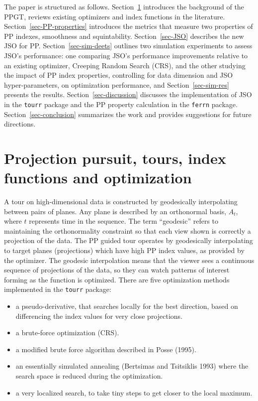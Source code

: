 \documentclass[
  12pt,
]{interact}
\providecommand{\tightlist}{%
  \setlength{\itemsep}{0pt}\setlength{\parskip}{0pt}}\usepackage{longtable,booktabs,array}
\theoremstyle{plain}
\begin{document}
The paper is structured as follows. Section~\ref{sec-background}
introduces the background of the PPGT, reviews existing optimizers and
index functions in the literature. Section~\ref{sec-PP-properties}
introduces the metrics that measure two properties of PP indexes,
smoothness and squintability. Section~\ref{sec-JSO} describes the new
JSO for PP. Section~\ref{sec-sim-deets} outlines two simulation
experiments to assess JSO's performance: one comparing JSO's performance
improvements relative to an existing optimizer, Creeping Random Search
(CRS), and the other studying the impact of PP index properties,
controlling for data dimension and JSO hyper-parameters, on optimization
performance, and Section~\ref{sec-sim-res} presents the results.
Section~\ref{sec-discussion} discusses the implementation of JSO in the
\texttt{tourr} package and the PP property calculation in the
\texttt{ferrn} package. Section~\ref{sec-conclusion} summarizes the work
and provides suggestions for future directions.

\section{Projection pursuit, tours, index functions and
optimization}\label{sec-background}

A tour on high-dimensional data is constructed by geodesically
interpolating between pairs of planes. Any plane is described by an
orthonormal basis, \(A_t\), where \(t\) represents time in the sequence.
The term ``geodesic'' refers to maintaining the orthonormality
constraint so that each view shown is correctly a projection of the
data. The PP guided tour operates by geodesically interpolating to
target planes (projections) which have high PP index values, as provided
by the optimizer. The geodesic interpolation means that the viewer sees
a continuous sequence of projections of the data, so they can watch
patterns of interest forming as the function is optimized. There are
five optimization methods implemented in the \texttt{tourr} package:

\begin{itemize}
\tightlist
\item
  a pseudo-derivative, that searches locally for the best direction,
  based on differencing the index values for very close projections.
\item
  a brute-force optimization (CRS).
\item
  a modified brute force algorithm described in Posse (1995).
\item
  an essentially simulated annealing (Bertsimas and Tsitsiklis 1993)
  where the search space is reduced during the optimization.
\item
  a very localized search, to take tiny steps to get closer to the local
  maximum.
\end{itemize}
\end{document}
